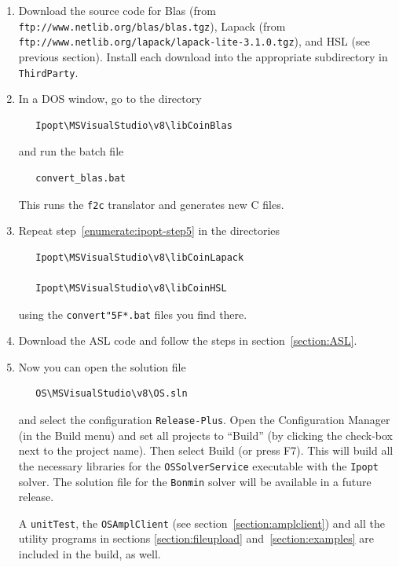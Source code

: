 \documentclass[11pt]{article}
\renewcommand{\_}{{\char"5F}}
\renewcommand{\{}{{\char"7B}}
\renewcommand{\}}{{\char"7D}}
\renewcommand{\^}{{\char"0D}}
\renewcommand{\'}{{\char"0D}}
\newcommand{\UrlBlas}{ftp://www.netlib.org/blas/blas.tgz}
\newcommand{\UrlLapack}{ftp://www.netlib.org/lapack/lapack-lite-3.1.0.tgz}
\begin{document}
\begin{enumerate}
\item{} Download the source code for Blas (from {\tt\UrlBlas}),
Lapack (from {\tt\UrlLapack}),
and HSL (see previous section).
Install each download into the appropriate subdirectory in {\tt ThirdParty}.

\item{} \label{enumerate:ipopt-step5}
In a DOS window, go to the directory

\begin{verbatim}
   Ipopt\MSVisualStudio\v8\libCoinBlas
\end{verbatim}

   and run the batch file

\begin{verbatim}
   convert_blas.bat
\end{verbatim}

   This runs the {\tt f2c} translator and generates new C files.%


\item{} Repeat step~\ref{enumerate:ipopt-step5} in the directories

\begin{verbatim}
   Ipopt\MSVisualStudio\v8\libCoinLapack

   Ipopt\MSVisualStudio\v8\libCoinHSL
\end{verbatim}

   using the {\tt convert\_*.bat} files you find there.

\item{}
   Download the ASL code and follow the steps in section~\ref{section:ASL}.

\item{}
Now you can open the solution file

\begin{verbatim}
   OS\MSVisualStudio\v8\OS.sln
\end{verbatim}

and select the configuration {\tt Release-Plus}.
Open the Configuration Manager (in the Build menu)
and set all projects to ``Build''
(by clicking the check-box next to the project name).
Then select Build (or press F7).
This will build all the necessary libraries for the
{\tt OSSolverService} executable
with the {\tt Ipopt} solver. The solution file for the {\tt Bonmin} solver will be
available in a future release.

A {\tt unitTest},
the {\tt OSAmplClient} (see section~\ref{section:amplclient})
and all the utility programs in sections \ref{section:fileupload}
and~\ref{section:examples} are included in the build, as well.
\end{enumerate}
\end{document}
